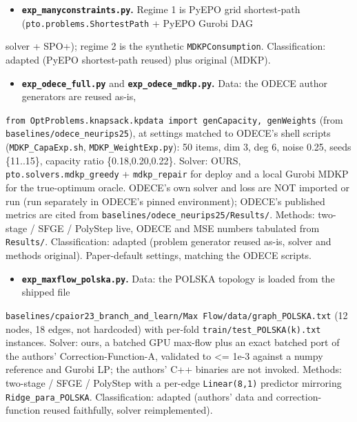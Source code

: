 \documentclass[10pt]{article}
\begin{document}
\begin{itemize}\setlength{\itemsep}{2pt}
\item \textbf{\texttt{exp\_manyconstraints.py}.} Regime 1 is PyEPO grid shortest-path (\texttt{pto.problems.ShortestPath} + PyEPO Gurobi DAG
\end{itemize}
  solver + SPO+); regime 2 is the synthetic \texttt{MDKPConsumption}. Classification: adapted (PyEPO shortest-path reused) plus
  original (MDKP).

\begin{itemize}\setlength{\itemsep}{2pt}
\item \textbf{\texttt{exp\_odece\_full.py}} and \textbf{\texttt{exp\_odece\_mdkp.py}.} Data: the ODECE author generators are reused as-is,
\end{itemize}
  \texttt{from OptProblems.knapsack.kpdata import genCapacity, genWeights} (from \texttt{baselines/odece\_neurips25}), at settings
  matched to ODECE's shell scripts (\texttt{MDKP\_CapaExp.sh}, \texttt{MDKP\_WeightExp.py}): 50 items, dim 3, deg 6, noise 0.25, seeds
  \{11..15\}, capacity ratio \{0.18,0.20,0.22\}. Solver: OURS, \texttt{pto.solvers.mdkp\_greedy} + \texttt{mdkp\_repair} for deploy and a
  local Gurobi MDKP for the true-optimum oracle. ODECE's own solver and loss are NOT imported or run (run separately in
  ODECE's pinned environment); ODECE's published metrics are cited from \texttt{baselines/odece\_neurips25/Results/}. Methods:
  two-stage / SFGE / PolyStep live, ODECE and MSE numbers tabulated from \texttt{Results/}. Classification: adapted (problem
  generator reused as-is, solver and methods original). Paper-default settings, matching the ODECE scripts.

\begin{itemize}\setlength{\itemsep}{2pt}
\item \textbf{\texttt{exp\_maxflow\_polska.py}.} Data: the POLSKA topology is loaded from the shipped file
\end{itemize}
  \texttt{baselines/cpaior23\_branch\_and\_learn/Max Flow/data/graph\_POLSKA.txt} (12 nodes, 18 edges, not hardcoded) with per-fold
  \texttt{train/test\_POLSKA(k).txt} instances. Solver: ours, a batched GPU max-flow plus an exact batched port of the authors'
  Correction-Function-A, validated to <= 1e-3 against a numpy reference and Gurobi LP; the authors' C++ binaries are not
  invoked. Methods: two-stage / SFGE / PolyStep with a per-edge \texttt{Linear(8,1)} predictor mirroring \texttt{Ridge\_para\_POLSKA}.
  Classification: adapted (authors' data and correction-function reused faithfully, solver reimplemented).
\end{document}
